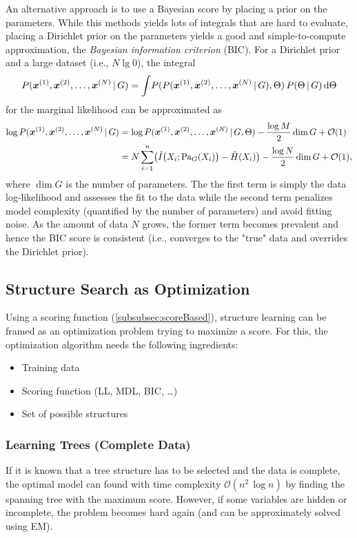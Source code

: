 				An alternative approach is to use a Bayesian score by placing a prior on the parameters. While this methods yields lots of integrals that are hard to evaluate, placing a Dirichlet prior on the parameters yields a good and simple-to-compute approximation, the \emph{Bayesian information criterion} (BIC). For a Dirichlet prior and a large dataset (i.e., \( N \lg 0 \)), the integral
				\begin{equation}
					P(\bm{x}^{(1)}, \bm{x}^{(2)}, \dots, \bm{x}^{(N)} \,\vert\, G) = \int\! P(P(\bm{x}^{(1)}, \bm{x}^{(2)}, \dots, \bm{x}^{(N)} \,\vert\, G), \Theta) \, P(\Theta \,\vert\, G) \dd{\Theta}
				\end{equation}
				for the marginal likelihood can be approximated as
				\begin{align}
					\log P(\bm{x}^{(1)}, \bm{x}^{(2)}, \dots, \bm{x}^{(N)} \,\vert\, G)
						&= \log P(\bm{x}^{(1)}, \bm{x}^{(2)}, \dots, \bm{x}^{(N)} \,\vert\, G, \Theta) - \frac{\log M}{2} \dim G + \mathcal{O}(1) \\
						&= N \sum_{i = 1}^{n} \bigl( \hat{I}\bigl( X_i; \operatorname{Pa}_G(X_i) \bigr) - \hat{H}(X_i) \bigr) - \frac{\log N}{2} \dim G + \mathcal{O}(1),
				\end{align}
				where \( \dim G \) is the number of parameters. The the first term is simply the data log-likelihood and assesses the fit to the data while the second term penalizes model complexity (quantified by the number of parameters) and avoid fitting noise. As the amount of data \(N\) grows, the former term becomes prevalent and hence the BIC score is consistent (i.e., converges to the "true" data and overrides the Dirichlet prior).

		\subsection{Structure Search as Optimization}
			Using a scoring function (\autoref{subsubsec:scoreBased}), structure learning can be framed as an optimization problem trying to maximize a score. For this, the optimization algorithm needs the following ingredients:
			\begin{itemize}
				\item Training data
				\item Scoring function (LL, MDL, BIC, \dots)
				\item Set of possible structures
			\end{itemize}

			\subsubsection{Learning Trees (Complete Data)}
				If it is known that a tree structure has to be selected and the data is complete, the optimal model can found with time complexity \( \mathcal{O}(n^2 \, \log n) \) by finding the spanning tree with the maximum score. However, if some variables are hidden or incomplete, the problem becomes hard again (and can be approximately solved using EM).


